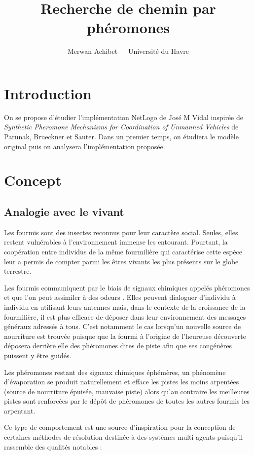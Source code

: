 \documentclass[12pt]{article}
\title{Recherche de chemin par phéromones}
\author{Merwan Achibet $\;$ \textendash $\;$  Université du Havre}
\date{}
\begin{document}
\maketitle

\section*{Introduction}

On se propose d'étudier l'implémentation NetLogo de José M Vidal
inspirée de \textit{Synthetic Pheromone Mechanisms for Coordination of
  Unmanned Vehicles} de Parunak, Brueckner et Sauter. Dans un premier
temps, on étudiera le modèle original puis on analysera
l'implémentation proposée.

\section{Concept}

\subsection{Analogie avec le vivant}

Les fourmis sont des insectes reconnus pour leur caractère
social. Seules, elles restent vulnérables à l'environnement immense
les entourant. Pourtant, la coopération entre individus de la même
fourmilière qui caractérise cette espèce leur a permis de compter
parmi les êtres vivants les plus présents sur le globe terrestre.

Les fourmis communiquent par le biais de signaux chimiques appelés
phéromones et que l'on peut assimiler à des odeurs
\cite{insectes}. Elles peuvent dialoguer d'individu à individu en
utilisant leurs antennes mais, dans le contexte de la croissance de la
fourmilière, il est plus efficace de déposer dans leur environnement
des messages généraux adressés à tous. C'est notamment le cas
lorsqu'un nouvelle source de nourriture est trouvée puisque que la
fourmi à l'origine de l'heureuse découverte déposera derrière elle des
phéromones dites de piste afin que ses congénères puissent y être
guidés.

Les phéromones restant des signaux chimiques éphémères, un phénomène
d'évaporation se produit naturellement et efface les pistes les moins
arpentées (source de nourriture épuisée, mauvaise piste) alors qu'au
contraire les meilleures pistes sont renforcées par le dépôt de
phéromones de toutes les autres fourmis les arpentant.

Ce type de comportement est une source d'inspiration pour la
conception de certaines méthodes de résolution destinée à des systèmes
multi-agents puisqu'il rassemble des qualités notables
\cite{parunak} :
\end{document}
